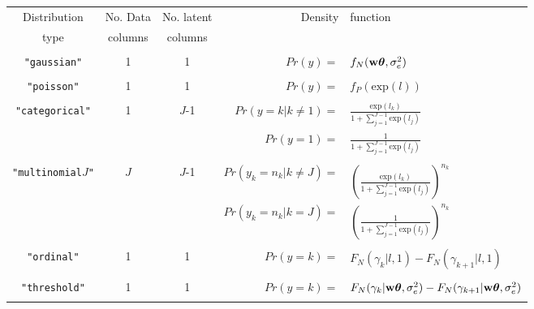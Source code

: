\documentclass{article}
\begin{document}
\begin{landscape}
\LTcapwidth=6.2in
\begin{longtable}{cccrl}
\hline
Distribution   &    No. Data       &         No. latent        &  Density & function \\
   type        &      columns      &           columns            &          &           \\   
\hline\\
   \texttt{"gaussian"}        &  1  &   1  &         $Pr(y) =$&$f_{N}({\bf w}{\bm \theta},\sigma^{2}_{e})$\\   
&&&&\\
   \texttt{"poisson"}        &  1  &   1 &               $Pr(y) =$&$ f_{P}(\textrm{exp}(l))$\\   
&&&&\\
   \texttt{"categorical"}        &  1  &   $J$-1  &     $Pr(y=k | k\neq1) =$&$ \frac{\textrm{exp}(l_{k})}{1+\sum^{J-1}_{j=1}\textrm{exp}(l_{j})}$ \\   
           &   &     &                                  $Pr(y=1) =$&$ \frac{1}{1+\sum^{J-1}_{j=1}\textrm{exp}(l_{j})}$ \\   
&&&&\\
   \texttt{"multinomial$J$"}  &  $J$    &  $J$-1  &     $Pr(y_{k}=n_{k}| k\neq J) =$&$ \left(\frac{\textrm{exp}(l_{k})}{1+\sum^{J-1}_{j=1}\textrm{exp}(l_{j})}\right)^{n_{k}}$ \\   
    &      &   &     $Pr(y_{k}=n_{k} | k=J) =$&$ \left(\frac{1}{1+\sum^{J-1}_{j=1}\textrm{exp}(l_{j})}\right)^{n_{k}}$ \\   
&&&&\\ 
   \texttt{"ordinal"}  &  1    &  1     &              $Pr(y=k) =$&$ F_{N}(\gamma_{k} | l,1)-F_{N}(\gamma_{k+1} | l,1)$ \\   
&&&&\\
   \texttt{"threshold"}  &  1    &  1     &              $Pr(y=k) =$&$ F_{N}(\gamma_{k} | {\bf w}{\bm \theta}, \sigma^{2}_{e})-F_{N}(\gamma_{k+1} | {\bf w}{\bm \theta}, \sigma^{2}_{e})$ \\   
&&&&\\



\end{longtable}
\end{landscape}
\end{document}
